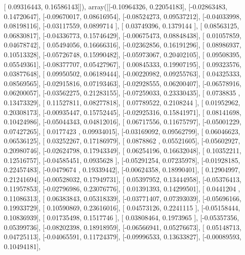 \documentclass{article}
\begin{document}
       [ 0.09316443,  0.16586143]]), array([[-0.10964326,  0.22054183],
       [-0.02863483,  0.14720647],
       [-0.09670017,  0.08616954],
       [-0.08524273,  0.09537212],
       [-0.04033998,  0.08198116],
       [-0.03117559,  0.0899714 ],
       [ 0.03749396,  0.1379144 ],
       [ 0.08563125,  0.06830817],
       [-0.04336773,  0.15746429],
       [-0.00675473,  0.08848438],
       [ 0.01057859,  0.04678742],
       [ 0.05494056,  0.16666316],
       [-0.02362856,  0.16191296],
       [ 0.08986937,  0.10513328],
       [-0.05726748,  0.15990482],
       [-0.05973067,  0.20402105],
       [ 0.09508395,  0.05549361],
       [-0.08377707,  0.05427967],
       [ 0.00845333,  0.19907195],
       [ 0.09323576,  0.03877648],
       [ 0.09950502,  0.06189444],
       [-0.00220982,  0.09255763],
       [ 0.04325333,  0.08569565],
       [-0.02915816,  0.07193463],
       [-0.02928555,  0.06200407],
       [-0.06578916,  0.06200057],
       [-0.03562275,  0.21283155],
       [-0.07259033,  0.23330435],
       [ 0.0738835 ,  0.13473329],
       [ 0.11527811,  0.08277818],
       [ 0.07789522,  0.2108244 ],
       [ 0.01952962,  0.20308173],
       [-0.00935447,  0.15752445],
       [-0.02925316,  0.15841971],
       [ 0.08141698,  0.10424986],
       [-0.05044343,  0.04812016],
       [ 0.06717556,  0.11675797],
       [-0.05001229,  0.07427265],
       [ 0.0177423 ,  0.09934015],
       [-0.03169092,  0.09562799],
       [ 0.06046623,  0.06536125],
       [ 0.03252267,  0.17186979],
       [ 0.0878862 ,  0.05521605],
       [-0.05602927,  0.20980746],
       [-0.02624798,  0.17943349],
       [ 0.06254196,  0.16632048],
       [ 0.10352211,  0.12516757],
       [-0.04585451,  0.0935628 ],
       [-0.05291254,  0.07235978],
       [-0.01928185,  0.22457483],
       [-0.0479674 ,  0.19339442],
       [-0.00624358,  0.18990401],
       [ 0.12904997,  0.21241694],
       [-0.00528032,  0.17949731],
       [ 0.05397952,  0.13444958],
       [-0.05376413,  0.11957853],
       [-0.02796986,  0.23076776],
       [ 0.01391393,  0.14299501],
       [ 0.0441204 ,  0.11086313],
       [ 0.06383843,  0.05318339],
       [-0.03771407,  0.07393039],
       [-0.05696166,  0.19933729],
       [ 0.10590869,  0.23616016],
       [ 0.04573126,  0.2241115 ],
       [-0.05158444,  0.10836939],
       [ 0.01735498,  0.1517746 ],
       [ 0.03808464,  0.1973965 ],
       [-0.05357356,  0.05399736],
       [-0.08202398,  0.18918959],
       [-0.06566941,  0.05276673],
       [ 0.05148713,  0.04725113],
       [-0.04065591,  0.11724379],
       [-0.09996533,  0.13633827],
       [-0.00089593,  0.10494181],
\end{document}
